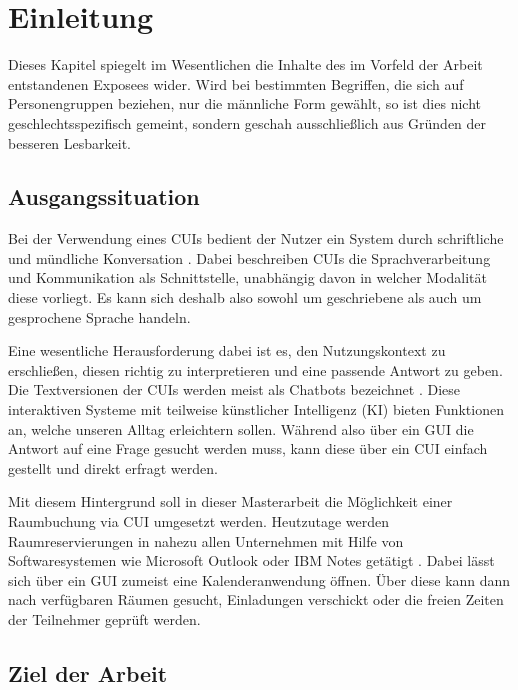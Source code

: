 \chapter{Einleitung}
\label{cha:einleitung}

Dieses Kapitel spiegelt im Wesentlichen die Inhalte des im Vorfeld der Arbeit entstandenen Exposees wider. Wird bei bestimmten Begriffen, die sich auf Personengruppen beziehen, nur die männliche Form gewählt, so ist dies nicht geschlechtsspezifisch gemeint, sondern geschah ausschließlich aus Gründen der besseren Lesbarkeit. 

\section{Ausgangssituation}
\label{sec:ausgangssituation}

Bei der Verwendung eines \acp{CUI} bedient der Nutzer ein System durch schriftliche und mündliche Konversation \cite[S. 11]{mctear_conversational_2016}. Dabei beschreiben \acp{CUI} die Sprachverarbeitung und Kommunikation als Schnittstelle, unabhängig davon in welcher Modalität diese vorliegt. Es kann sich deshalb also sowohl um geschriebene als auch um gesprochene Sprache handeln. 

Eine wesentliche Herausforderung dabei ist es, den Nutzungskontext zu erschließen, diesen richtig zu interpretieren und eine passende Antwort zu geben. Die Textversionen der \acp{CUI} werden meist als Chatbots bezeichnet \cite[S. 1]{khan_build_2018}. Diese interaktiven Systeme mit teilweise künstlicher Intelligenz (\acs{KI}) bieten Funktionen an, welche unseren Alltag erleichtern sollen. Während also über ein \ac{GUI} die Antwort auf eine Frage gesucht werden muss, kann diese über ein \acl{CUI} einfach gestellt und direkt erfragt werden.

Mit diesem Hintergrund soll in dieser Masterarbeit die Möglichkeit einer Raumbuchung via \acl{CUI} umgesetzt werden. Heutzutage werden Raumreservierungen in nahezu allen Unternehmen mit Hilfe von Softwaresystemen wie Microsoft Outlook oder IBM Notes getätigt  \cite{foitzik_wie_2017}. Dabei lässt sich über ein \ac{GUI} zumeist eine Kalenderanwendung öffnen. Über diese kann dann nach verfügbaren Räumen gesucht, Einladungen verschickt oder die freien Zeiten der Teilnehmer geprüft werden.

\section{Ziel der Arbeit}
\label{sec:ziel-der-arbeit}

